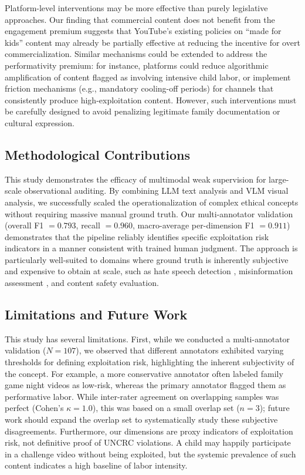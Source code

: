 \documentclass[]{ieeeaccess}
\begin{document}
Platform-level interventions may be more effective than purely legislative approaches. Our finding that commercial content does not benefit from the engagement premium suggests that YouTube's existing policies on ``made for kids'' content may already be partially effective at reducing the incentive for overt commercialization. Similar mechanisms could be extended to address the performativity premium: for instance, platforms could reduce algorithmic amplification of content flagged as involving intensive child labor, or implement friction mechanisms (e.g., mandatory cooling-off periods) for channels that consistently produce high-exploitation content. However, such interventions must be carefully designed to avoid penalizing legitimate family documentation or cultural expression.

\subsection{Methodological Contributions}

This study demonstrates the efficacy of multimodal weak supervision for large-scale observational auditing. By combining LLM text analysis and VLM visual analysis, we successfully scaled the operationalization of complex ethical concepts without requiring massive manual ground truth. Our multi-annotator validation (overall F1 $= 0.793$, recall $= 0.960$, macro-average per-dimension F1 $= 0.911$) demonstrates that the pipeline reliably identifies specific exploitation risk indicators in a manner consistent with trained human judgment. The approach is particularly well-suited to domains where ground truth is inherently subjective and expensive to obtain at scale, such as hate speech detection \cite{ding2026feature}, misinformation assessment \cite{tian2025empirical}, and content safety evaluation.

\subsection{Limitations and Future Work}

This study has several limitations. First, while we conducted a multi-annotator validation ($N=107$), we observed that different annotators exhibited varying thresholds for defining exploitation risk, highlighting the inherent subjectivity of the concept. For example, a more conservative annotator often labeled family game night videos as low-risk, whereas the primary annotator flagged them as performative labor. While inter-rater agreement on overlapping samples was perfect (Cohen's $\kappa=1.0$), this was based on a small overlap set ($n=3$); future work should expand the overlap set to systematically study these subjective disagreements. Furthermore, our dimensions are proxy indicators of exploitation risk, not definitive proof of UNCRC violations. A child may happily participate in a challenge video without being exploited, but the systemic prevalence of such content indicates a high baseline of labor intensity.
\end{document}
